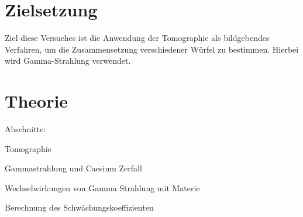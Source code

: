 \section{Zielsetzung}
\label{sec:Zielsetzung}
Ziel diese Versuches ist die Anwendung der Tomographie als bildgebendes Verfahren, um die Zusammensetzung verschiedener Würfel zu bestimmen.
Hierbei wird Gamma-Strahlung verwendet.

\section{Theorie}
\label{sec:Theorie}

Abschnitte:

Tomographie

Gammastrahlung und Caesium Zerfall

Wechselwirkungen von Gamma Strahlung mit Materie

Berechnung des Schwächungskoeffizienten 



